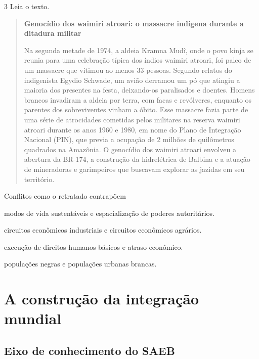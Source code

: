 \num{3} Leia o texto.

\begin{quote}
\textbf{Genocídio dos waimiri atroari: o massacre indígena durante a ditadura militar}

Na segunda metade de 1974, a aldeia Kramna Mudî, onde o povo kinja se
reunia para uma celebração típica dos índios waimiri atroari, foi palco
de um massacre que vitimou ao menos 33 pessoas. Segundo relatos do
indigenista Egydio Schwade, um avião derramou um pó que atingiu a
maioria dos presentes na festa, deixando-os paralisados e doentes.
Homens brancos invadiram a aldeia por terra, com facas e revólveres,
enquanto os parentes dos sobreviventes vinham a óbito. Esse massacre
fazia parte de uma série de atrocidades cometidas pelos militares na
reserva waimiri atroari durante os anos 1960 e 1980, em nome do Plano de
Integração Nacional (PIN), que previa a ocupação de 2 milhões de
quilômetros quadrados na Amazônia. O genocídio dos waimiri atroari
envolveu a abertura da BR-174, a construção da hidrelétrica de Balbina e
a atuação de mineradoras e garimpeiros que buscavam explorar as jazidas
em seu território.

\end{quote}

Conflitos como o retratado contrapõem

\begin{escolha}
\item
  modos de vida sustentáveis e espacialização de poderes autoritários.
\item
  circuitos econômicos industriais e circuitos econômicos agrários.
\item
  execução de direitos humanos básicos e atraso econômico.
\item
  populações negras e populações urbanas brancas.
\end{escolha}

\chapter{A construção da integração mundial}

\section{Eixo de conhecimento do SAEB}

